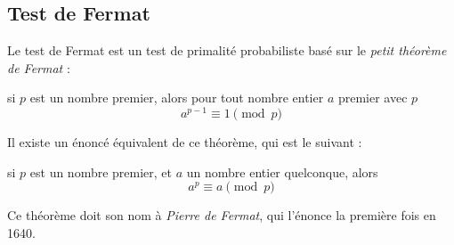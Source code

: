 \subsection{Test de Fermat}
	Le test de Fermat est un test de primalité probabiliste basé sur le \textit{petit théorème de Fermat} :
	
	\vspace{-1.5em}\begin{adjustwidth}{1.5cm}{1.5cm} 
	\begin{Th}
		\label{ThFermat1}
		si $p$ est un nombre premier, alors pour tout nombre entier $a$ premier avec $p$
		\[a^{p-1}\equiv 1 \pmod p\]
	\end{Th}
	\end{adjustwidth}\vspace{0.5em}
	
	Il existe un énoncé équivalent de ce théorème, qui est le suivant :
	
	\vspace{-1.5em}\begin{adjustwidth}{1.5cm}{1.5cm} 
	\begin{Th}
		\label{ThFermat2}
		si $p$ est un nombre premier, et $a$ un nombre entier quelconque, alors
		\[a^{p}\equiv a \pmod p\]
	\end{Th}
	\end{adjustwidth}\vspace{0.5em}
	
	Ce théorème doit son nom à \textit{Pierre de Fermat}, qui l'énonce la première fois en 1640. 
	
